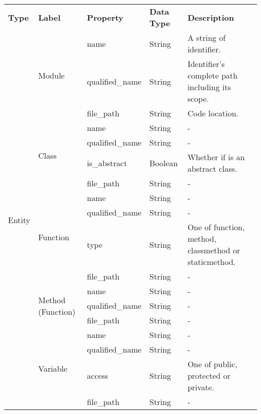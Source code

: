 \begin{tabular}{p{1.6cm}p{1.7cm}p{2cm}p{3.3cm}p{7.5cm}}
\toprule
\textbf{Type} & \textbf{Label} & \textbf{Property} & \textbf{Data Type} & \textbf{Description} \\
\cmidrule{1-1}\cmidrule{2-2}\cmidrule{3-3}\cmidrule{4-4}\cmidrule{5-5}
\multirow{18}{*}{Entity} & \multirow{3}{*}{Module} & name & String & A string of identifier. \\
\cmidrule{3-3}\cmidrule{4-4}\cmidrule{5-5}
 &  & qualified\_name & String & Identifier's complete path including its scope. \\
\cmidrule{3-3}\cmidrule{4-4}\cmidrule{5-5}
 &  & file\_path & String & Code location. \\
\cmidrule{2-2}\cmidrule{3-3}\cmidrule{4-4}\cmidrule{5-5}
 & \multirow{4}{*}{Class} & name & String & - \\
\cmidrule{3-3}\cmidrule{4-4}\cmidrule{5-5}
 &  & qualified\_name & String & - \\
\cmidrule{3-3}\cmidrule{4-4}\cmidrule{5-5}
 &  & is\_abstract & Boolean & Whether if is an abstract class. \\
\cmidrule{3-3}\cmidrule{4-4}\cmidrule{5-5}
 &  & file\_path & String & - \\
\cmidrule{2-2}\cmidrule{3-3}\cmidrule{4-4}\cmidrule{5-5}
 & \multirow{4}{*}{Function} & name & String & - \\
\cmidrule{3-3}\cmidrule{4-4}\cmidrule{5-5}
 &  & qualified\_name & String & - \\
\cmidrule{3-3}\cmidrule{4-4}\cmidrule{5-5}
 &  & type & String & One of function, method, classmethod or staticmethod. \\
\cmidrule{3-3}\cmidrule{4-4}\cmidrule{5-5}
 &  & file\_path & String & - \\
\cmidrule{2-2}\cmidrule{3-3}\cmidrule{4-4}\cmidrule{5-5}
 & \multirow{3}{*}{Method (Function)} & name & String & - \\
\cmidrule{3-3}\cmidrule{4-4}\cmidrule{5-5}
 &  & qualified\_name & String & - \\
\cmidrule{3-3}\cmidrule{4-4}\cmidrule{5-5}
 &  & file\_path & String & - \\
\cmidrule{2-2}\cmidrule{3-3}\cmidrule{4-4}\cmidrule{5-5}
 & \multirow{4}{*}{Variable} & name & String & - \\
\cmidrule{3-3}\cmidrule{4-4}\cmidrule{5-5}
 &  & qualified\_name & String & - \\
\cmidrule{3-3}\cmidrule{4-4}\cmidrule{5-5}
 &  & access & String & One of public, protected or private. \\
\cmidrule{3-3}\cmidrule{4-4}\cmidrule{5-5}
 &  & file\_path & String & - \\
\bottomrule
\end{tabular}

